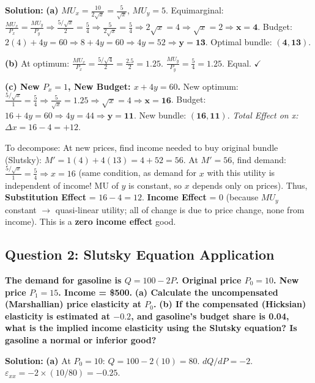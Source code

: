 \documentclass[10pt,a4paper]{article}
\begin{document}
\begin{multicols}{2}
\vspace{0.1cm}
\textbf{Solution:}
\textbf{(a)} $MU_x = \frac{10}{2\sqrt{x}} = \frac{5}{\sqrt{x}}$, $MU_y = 5$.
Equimarginal: $\frac{MU_x}{P_x} = \frac{MU_y}{P_y} \Rightarrow \frac{5/\sqrt{x}}{2} = \frac{5}{4} \Rightarrow \frac{5}{2\sqrt{x}} = \frac{5}{4} \Rightarrow 2\sqrt{x} = 4 \Rightarrow \sqrt{x}=2 \Rightarrow \mathbf{x=4}$.
Budget: $2(4) + 4y = 60 \Rightarrow 8 + 4y = 60 \Rightarrow 4y=52 \Rightarrow \mathbf{y=13}$.
Optimal bundle: $\mathbf{(4, 13)}$.

\textbf{(b)} At optimum: $\frac{MU_x}{P_x} = \frac{5/\sqrt{4}}{2} = \frac{2.5}{2} = 1.25$. $\frac{MU_y}{P_y} = \frac{5}{4} = 1.25$. Equal. $\checkmark$

\vspace{0.05cm}
\textbf{(c) New $P_x=1$, New Budget: $x + 4y = 60$.}
New optimum: $\frac{5/\sqrt{x}}{1} = \frac{5}{4} \Rightarrow \frac{5}{\sqrt{x}} = 1.25 \Rightarrow \sqrt{x} = 4 \Rightarrow \mathbf{x=16}$. Budget: $16 + 4y = 60 \Rightarrow 4y=44 \Rightarrow \mathbf{y=11}$. New bundle: $\mathbf{(16, 11)}$.
\textit{Total Effect on x:} $\Delta x = 16 - 4 = +12$.

To decompose: At new prices, find income needed to buy original bundle (Slutsky): $M' = 1(4) + 4(13) = 4 + 52 = 56$. At $M'=56$, find demand: $\frac{5/\sqrt{x}}{1} = \frac{5}{4} \Rightarrow x=16$ (same condition, as demand for $x$ with this utility is independent of income! MU of $y$ is constant, so $x$ depends only on prices). Thus, \textbf{Substitution Effect} = $16 - 4 = 12$. \textbf{Income Effect} = $0$ (because $MU_y$ constant $\to$ quasi-linear utility; all of change is due to price change, none from income). This is a \textbf{zero income effect} good.

\vspace{0.2cm}

\subsection*{Question 2: Slutsky Equation Application}
\textbf{The demand for gasoline is $Q = 100 - 2P$. Original price $P_0 = 10$. New price $P_1 = 15$. Income = \$500.}
\textbf{(a) Calculate the uncompensated (Marshallian) price elasticity at $P_0$.}
\textbf{(b) If the compensated (Hicksian) elasticity is estimated at $-0.2$, and gasoline's budget share is 0.04, what is the implied income elasticity using the Slutsky equation? Is gasoline a normal or inferior good?}

\vspace{0.1cm}
\textbf{Solution:}
\textbf{(a)} At $P_0=10$: $Q = 100 - 2(10) = 80$. $dQ/dP = -2$. $\varepsilon_{xx} = -2 \times (10/80) = \mathbf{-0.25}$.


\end{multicols}
\end{document}
